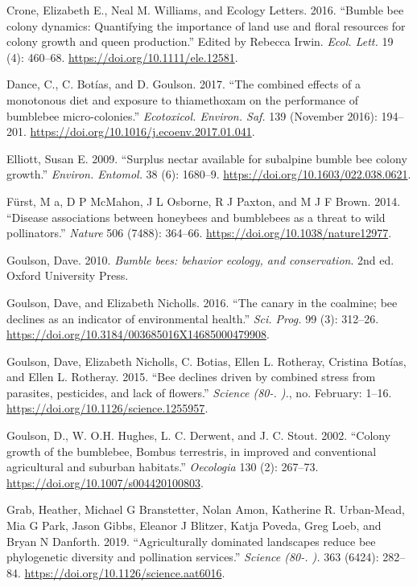 \documentclass[11pt,]{article}
\begin{document}
\leavevmode\hypertarget{ref-Crone2016}{}%
Crone, Elizabeth E., Neal M. Williams, and Ecology Letters. 2016.
``Bumble bee colony dynamics: Quantifying the importance of land use and
floral resources for colony growth and queen production.'' Edited by
Rebecca Irwin. \emph{Ecol. Lett.} 19 (4): 460--68.
\url{https://doi.org/10.1111/ele.12581}.

\leavevmode\hypertarget{ref-Dance2017}{}%
Dance, C., C. Botías, and D. Goulson. 2017. ``The combined effects of a
monotonous diet and exposure to thiamethoxam on the performance of
bumblebee micro-colonies.'' \emph{Ecotoxicol. Environ. Saf.} 139
(November 2016): 194--201.
\url{https://doi.org/10.1016/j.ecoenv.2017.01.041}.

\leavevmode\hypertarget{ref-Elliott2009}{}%
Elliott, Susan E. 2009. ``Surplus nectar available for subalpine bumble
bee colony growth.'' \emph{Environ. Entomol.} 38 (6): 1680--9.
\url{https://doi.org/10.1603/022.038.0621}.

\leavevmode\hypertarget{ref-Furst2014}{}%
Fürst, M a, D P McMahon, J L Osborne, R J Paxton, and M J F Brown. 2014.
``Disease associations between honeybees and bumblebees as a threat to
wild pollinators.'' \emph{Nature} 506 (7488): 364--66.
\url{https://doi.org/10.1038/nature12977}.

\leavevmode\hypertarget{ref-Goulson2008}{}%
Goulson, Dave. 2010. \emph{Bumble bees: behavior ecology, and
conservation}. 2nd ed. Oxford University Press.

\leavevmode\hypertarget{ref-Goulson2016}{}%
Goulson, Dave, and Elizabeth Nicholls. 2016. ``The canary in the
coalmine; bee declines as an indicator of environmental health.''
\emph{Sci. Prog.} 99 (3): 312--26.
\url{https://doi.org/10.3184/003685016X14685000479908}.

\leavevmode\hypertarget{ref-Goulson2015c}{}%
Goulson, Dave, Elizabeth Nicholls, C. Botias, Ellen L. Rotheray,
Cristina Botías, and Ellen L. Rotheray. 2015. ``Bee declines driven by
combined stress from parasites, pesticides, and lack of flowers.''
\emph{Science (80-. ).}, no. February: 1--16.
\url{https://doi.org/10.1126/science.1255957}.

\leavevmode\hypertarget{ref-Goulson2002c}{}%
Goulson, D., W. O.H. Hughes, L. C. Derwent, and J. C. Stout. 2002.
``Colony growth of the bumblebee, Bombus terrestris, in improved and
conventional agricultural and suburban habitats.'' \emph{Oecologia} 130
(2): 267--73. \url{https://doi.org/10.1007/s004420100803}.

\leavevmode\hypertarget{ref-Grab2019}{}%
Grab, Heather, Michael G Branstetter, Nolan Amon, Katherine R.
Urban-Mead, Mia G Park, Jason Gibbs, Eleanor J Blitzer, Katja Poveda,
Greg Loeb, and Bryan N Danforth. 2019. ``Agriculturally dominated
landscapes reduce bee phylogenetic diversity and pollination services.''
\emph{Science (80-. ).} 363 (6424): 282--84.
\url{https://doi.org/10.1126/science.aat6016}.
\end{document}
